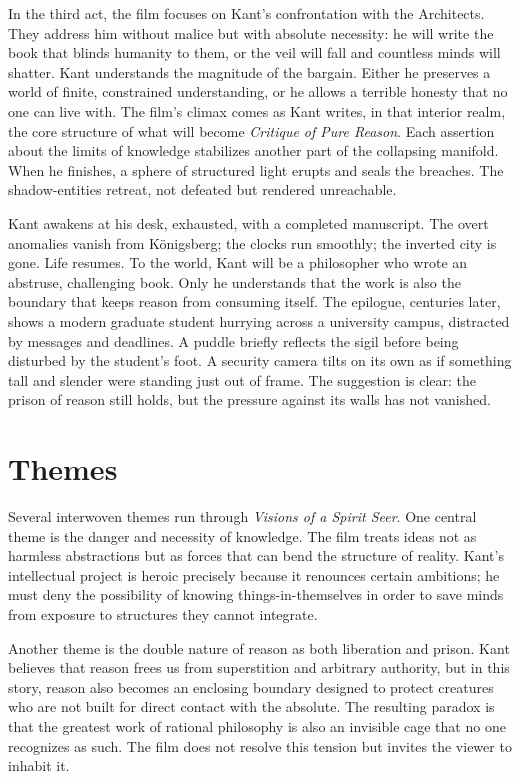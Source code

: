 \documentclass[12pt]{article}
\begin{document}
In the third act, the film focuses on Kant’s confrontation with the Architects. They address him without malice but with absolute necessity: he will write the book that blinds humanity to them, or the veil will fall and countless minds will shatter. Kant understands the magnitude of the bargain. Either he preserves a world of finite, constrained understanding, or he allows a terrible honesty that no one can live with. The film’s climax comes as Kant writes, in that interior realm, the core structure of what will become \emph{Critique of Pure Reason}. Each assertion about the limits of knowledge stabilizes another part of the collapsing manifold. When he finishes, a sphere of structured light erupts and seals the breaches. The shadow-entities retreat, not defeated but rendered unreachable.

Kant awakens at his desk, exhausted, with a completed manuscript. The overt anomalies vanish from Königsberg; the clocks run smoothly; the inverted city is gone. Life resumes. To the world, Kant will be a philosopher who wrote an abstruse, challenging book. Only he understands that the work is also the boundary that keeps reason from consuming itself. The epilogue, centuries later, shows a modern graduate student hurrying across a university campus, distracted by messages and deadlines. A puddle briefly reflects the sigil before being disturbed by the student’s foot. A security camera tilts on its own as if something tall and slender were standing just out of frame. The suggestion is clear: the prison of reason still holds, but the pressure against its walls has not vanished.

\section*{Themes}

Several interwoven themes run through \emph{Visions of a Spirit Seer}. One central theme is the danger and necessity of knowledge. The film treats ideas not as harmless abstractions but as forces that can bend the structure of reality. Kant’s intellectual project is heroic precisely because it renounces certain ambitions; he must deny the possibility of knowing things-in-themselves in order to save minds from exposure to structures they cannot integrate.

Another theme is the double nature of reason as both liberation and prison. Kant believes that reason frees us from superstition and arbitrary authority, but in this story, reason also becomes an enclosing boundary designed to protect creatures who are not built for direct contact with the absolute. The resulting paradox is that the greatest work of rational philosophy is also an invisible cage that no one recognizes as such. The film does not resolve this tension but invites the viewer to inhabit it.
\end{document}
